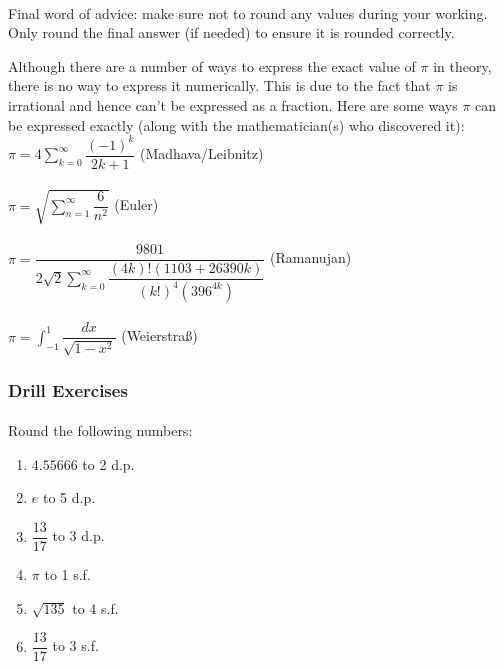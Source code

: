 \documentclass[12pt, a4paper, titlepage, twoside]{article}
\begin{document}
	\paragraph{}
	Final word of advice: make sure not to round any values during your working. Only round the final answer (if needed) to ensure
	it is rounded correctly.\\
	
	\begin{fr}[Finding $\pi$]
		Although there are a number of ways to express the exact value of $\pi$ in theory, there is no way to express it numerically.
		This is due to the fact that $\pi$ is irrational and hence can't be expressed as a fraction. Here are some ways $\pi$ can
		be expressed exactly (along with the mathematician(s) who discovered it):\\
		
		\hfill $\displaystyle \pi = 4 \sum_{k=0}^{\infty} \dfrac{(-1)^k}{2k+1}$ \hfill (Madhava/Leibnitz)\\ \\
		
		\hfill $\displaystyle \pi = \sqrt{\sum_{n=1}^{\infty} \dfrac{6}{n^2}}$ \hfill (Euler)\\ \\
		
		\hfill $\displaystyle \pi = \dfrac{9801}{2\sqrt{2} \displaystyle\sum_{k=0}^{\infty} \dfrac{(4k)!(1103 + 26390k)}
		{(k!)^4 (396^{4k})}}$ \hfill (Ramanujan)\\ \\
		
		\hfill $\displaystyle \pi = \int_{-1}^1 \dfrac{dx}{\sqrt{1-x^2}}$ 
		\hfill(Weierstra{\ss}) 
	\end{fr}
	
	\subsubsection*{Drill Exercises}
	
	\paragraph{}
	 Round the following numbers:
	
	\begin{multicols}{2}
		\begin{enumerate}[label=\textbf{(\alph*)}]
			\item $4.55666$ to 2 d.p.
			\item $e$ to 5 d.p.
			\item $\dfrac{13}{17}$ to 3 d.p.
			\item $\pi$ to 1 s.f.
			\item $\sqrt{135}$ to 4 s.f.
			\item $\dfrac{13}{17}$ to 3 s.f.
		\end{enumerate}
	\end{multicols}
	
\end{document}
